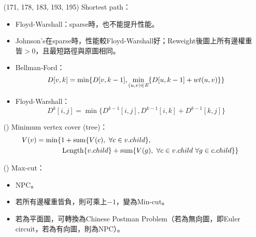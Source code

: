 \item \begin{theorem}{(171, 178, 183, 193, 195)} Shortest path： \begin{itemize}
        \item Floyd-Warshall：sparse時，也不能提升性能。
        \item Johnson's在sparse時，性能較Floyd-Warshall好；Reweight後圖上所有邊權重皆$>0$，且最短路徑與原圖相同。
        \item Bellman-Ford：\begin{equation}
            D[v, k] = \min \{D[v, k - 1], \min_{(u, v) \in \textit{E}} \{D[u, k - 1] + wt(u, v)\}\}
        \end{equation}
        \item Floyd-Warshall：\begin{equation}
            D^k[i, j] = \min\{D^{k - 1}[i, j], D^{k - 1}[i, k] + D^{k - 1}[k, j]\}
        \end{equation}
    \end{itemize}
\end{theorem}

\item \begin{theorem}{()} Minimum vertex cover (tree)：\begin{equation}
        \begin{aligned}
            V(v) = \min \{& 1 + \operatorname{sum}\{V(c), \ \forall c \in v.child\}, \\
            & \operatorname{Length}\{v.child\} + \operatorname{sum}\{V(g), \ \forall c \in v.child \ \forall g \in c.child\}
        \}   
        \end{aligned}
    \end{equation}
\end{theorem}

\item \begin{theorem}{()} Max-cut： \begin{itemize}
        \item NPC。
        \item 若所有邊權重皆負，則可乘上$-1$，變為Min-cut。
        \item 若為平面圖，可轉換為Chinese Postman Problem（若為無向圖，即Euler circuit，若為有向圖，則為NPC）。
    \end{itemize}
\end{theorem}
